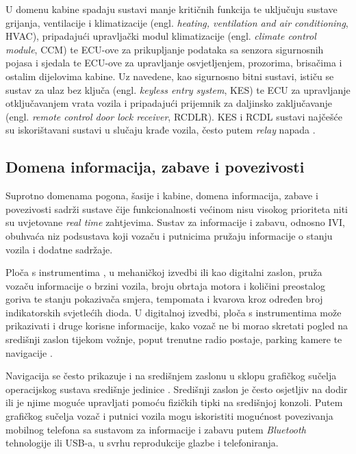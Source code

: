 \documentclass[times, utf8, diplomski, numeric]{fer}
\begin{document}
U domenu kabine spadaju sustavi manje kritičnih funkcija te uključuju sustave grijanja, ventilacije i klimatizacije (engl. \textit{heating, ventilation and air conditioning}, HVAC), pripadajući upravljački modul klimatizacije (engl. \textit{climate control module}, CCM) te ECU-ove za prikupljanje podataka sa senzora sigurnosnih pojasa i sjedala te ECU-ove za upravljanje osvjetljenjem, prozorima, brisačima i ostalim dijelovima kabine. Uz navedene, kao sigurnosno bitni sustavi, ističu se sustav za ulaz bez ključa (engl. \textit{keyless entry system}, KES) te ECU za upravljanje otključavanjem vrata vozila i pripadajući prijemnik za daljinsko zaključavanje (engl. \textit{remote control door lock receiver}, RCDLR). KES i RCDL sustavi najčešće su iskorištavani sustavi u slučaju krađe vozila, često putem \textit{relay} napada \cite{nasser2023automotive, cbc2020relay}.

\subsection{Domena informacija, zabave i povezivosti}
Suprotno domenama pogona, šasije i kabine, domena informacija, zabave i povezivosti sadrži sustave čije funkcionalnosti većinom nisu visokog prioriteta niti su uvjetovane \textit{real time} zahtjevima. Sustav za informacije i zabavu, odnosno IVI, obuhvaća niz podsustava koji vozaču i putnicima pružaju informacije o stanju vozila i dodatne sadržaje. 

Ploča s instrumentima , u mehaničkoj izvedbi ili kao digitalni zaslon, pruža vozaču informacije o brzini vozila, broju obrtaja motora i količini preostalog goriva te stanju pokazivača smjera, tempomata i kvarova kroz određen broj indikatorskih svjetlećih dioda. U digitalnoj izvedbi, ploča s instrumentima može prikazivati i druge korisne informacije, kako vozač ne bi morao skretati pogled na središnji zaslon tijekom vožnje, poput trenutne radio postaje, parking kamere te navigacije \cite{bosch2022handbook, nasser2023automotive}. 

Navigacija se često prikazuje i na središnjem zaslonu u sklopu grafičkog sučelja operacijskog sustava središnje jedinice . Središnji zaslon je često osjetljiv na dodir ili je njime moguće upravljati pomoću fizičkih tipki na središnjoj konzoli. Putem grafičkog sučelja vozač i putnici vozila mogu iskoristiti mogućnost povezivanja mobilnog telefona sa sustavom za informacije i zabavu putem \textit{Bluetooth} tehnologije ili USB-a, u svrhu reprodukcije glazbe i telefoniranja.
\end{document}
